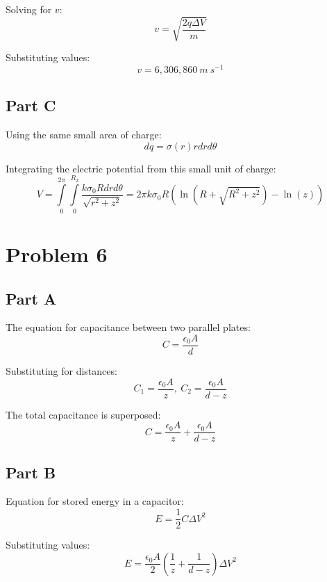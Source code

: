 \documentclass{article}
\begin{document}
Solving for $v$:
$$ v = \sqrt{\frac{ 2 q \Delta V }{ m }} $$

Substituting values:
$$ v = 6,306,860 \ \si{m\ s^{-1}} $$

\subsection*{Part C}

Using the same small area of charge:
$$ dq = \sigma(r) r dr d\theta $$

Integrating the electric potential from this small unit of charge:
$$ V = \int\limits_{0}^{2 \pi}\int\limits_{0}^{R_{2}} \frac{ k \sigma_{0} R dr
  d\theta}{\sqrt{r^{2} + z^{2}}} = 2 \pi k \sigma_{0} R \left(\ln(R + \sqrt{R^{2} +
z^{2}}) - \ln(z)\right)$$

\section*{Problem 6}

\subsection*{Part A}

The equation for capacitance between two parallel plates:
$$ C = \frac{ \epsilon_{0} A }{ d } $$

Substituting for distances:
$$ C_{1} = \frac{ \epsilon_{0} A }{ z },\ C_{2} = \frac{ \epsilon_{0} A }{ d - z } $$

The total capacitance is superposed:
$$ C =  \frac{ \epsilon_{0} A }{ z } + \frac{ \epsilon_{0} A }{ d - z }$$

\subsection*{Part B}

Equation for stored energy in a capacitor:
$$ E = \frac{ 1 }{ 2 } C \Delta V^{2} $$

Substituting values:
$$ E = \frac{ \epsilon_{0} A }{ 2 } \left( \frac{ 1 }{ z } + \frac{ 1 }{ d - z }
\right) \Delta V^{2} $$
\end{document}
